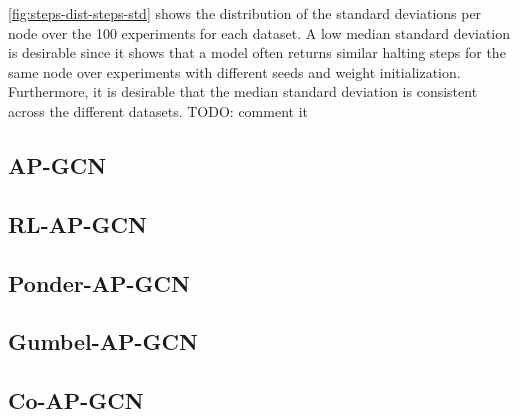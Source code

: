 \documentclass{gdl}
\begin{document}
\autoref{fig:steps-dist-steps-std} shows the distribution of the standard deviations per node over the 100 experiments for each dataset. A low median standard deviation is desirable since it shows that a model often returns similar halting steps for the same node over experiments with different seeds and weight initialization. Furthermore, it is desirable that the median standard deviation is consistent across the different datasets.  TODO: comment it


\subsection{AP-GCN}

\subsection{RL-AP-GCN}

\subsection{Ponder-AP-GCN}

\subsection{Gumbel-AP-GCN}

\subsection{Co-AP-GCN}
\end{document}

